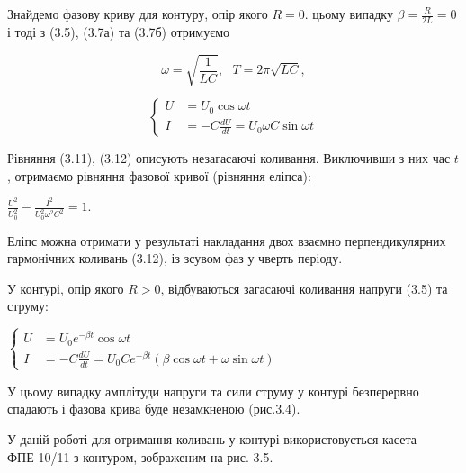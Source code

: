 \documentclass[12pt,a4paper]{article}
\begin{document}
    Знайдемо фазову криву для контуру, опір якого $R = 0$. цьому випадку
    $\displaystyle \beta = \frac{R}{2L} = 0$ і тоді з (3.5), (3.7а) та (3.7б) отримуємо

    \begin{equation}
        \omega = \sqrt{\frac{1}{LC}},\text{ } T = 2\pi \sqrt{LC},
        \tag{3.11}
    \end{equation}

    \begin{equation}
        \left\{
        \begin{aligned}
            U &= U_0 \cos \omega t \\
            I &= -C \frac{dU}{dt} = U_0 \omega C \sin \omega t
        \end{aligned}
        \right.
        \tag{3.12}
    \end{equation}

    Рівняння (3.11), (3.12) описують незагасаючі коливання.
    Виключивши з них час $t$, отримаємо рівняння фазової кривої (рівняння еліпса):

    \begin{center}
        $\displaystyle \frac{U^2}{U_0^2} - \frac{I^2}{U_0^2 \omega^2 C^2} = 1$.
    \end{center}

    Еліпс можна отримати у результаті накладання двох взаємно перпендикулярних
    гармонічних коливань (3.12), із зсувом фаз у чверть періоду.

    У контурі, опір якого $R>0$, відбуваються загасаючі коливання напруги (3.5) та струму:
    \begin{center}
        $
        \left\{
        \begin{aligned}
            U &= U_0 e^{-\beta t} \cos \omega t \\
            I &= -C \frac{dU}{dt} = U_0C e^{-\beta t} (\beta \cos \omega t + \omega \sin \omega t)
        \end{aligned}
        \right.
        $
    \end{center}

    У цьому випадку амплітуди напруги та сили струму у контурі безперервно
    спадають і фазова крива буде незамкненою (рис.3.4).

    У даній роботі для отримання коливань у контурі використовується касета
    ФПЕ-10/11 з контуром, зображеним на рис. 3.5.
\end{document}
